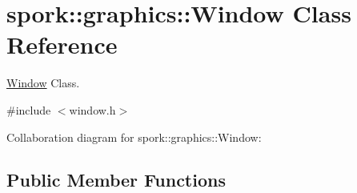 \hypertarget{classspork_1_1graphics_1_1_window}{}\section{spork\+:\+:graphics\+:\+:Window Class Reference}
\label{classspork_1_1graphics_1_1_window}


\hyperlink{classspork_1_1graphics_1_1_window}{Window} Class.  




{\ttfamily \#include $<$window.\+h$>$}



Collaboration diagram for spork\+:\+:graphics\+:\+:Window\+:
\subsection*{Public Member Functions}
